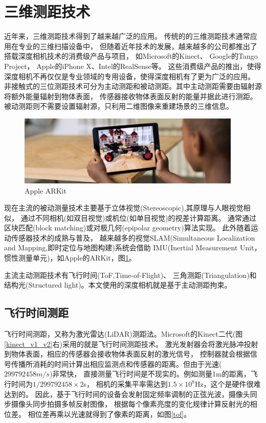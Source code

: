 \section{三维测距技术}
近年来，三维测距技术得到了越来越广泛的应用。
传统的的三维测距技术通常应用在专业的三维扫描设备中，
但随着近年技术的发展，越来越多的公司都推出了搭载深度相机技术的消费级产品与项目，
如Microsoft的Kinect\cite{microsoft_kinect}、
Google的Tango\cite{google_tango} Project，
Apple的iPhone X\cite{apple_iphoneX}、Intel的RealSense\cite{intel_realsense}等。
这些消费级产品的推出，使得深度相机不再仅仅是专业领域的专用设备，使得深度相机有了更为广泛的应用。
非接触式的三位测距技术可分为主动测距和被动测距。其中主动测距需要由辐射源将额外能量辐射到物体表面，
传感器接收物体表面反射的能量并据此进行测距。被动测距则不需要设置辐射源，只利用二维图像来重建场景的三维信息。

\begin{figure}[h]
    \centering
    \includegraphics[width=0.95\textwidth]{./Pictures/ARKit.eps}
    \caption{Apple ARKit}
    \label{arkit}
\end{figure}
现在主流的被动测量技术主要基于立体视觉(Stereoscopic),其原理与人眼视觉相似，
通过不同相机(如双目视觉)或机位(如单目视觉)的视差计算距离。
通常通过区块匹配(block matching)或对极几何(epipolar geometry)算法实现。
此外随着运动传感器技术的成熟与普及，
越来越多的视觉SLAM(Simultaneous Localization and Mapping,即时定位与地图构建)系统会借助
IMU(Inertial Measurement Unit，惯性测量单元)，如Apple的ARKit\cite{apple_arkit}，图\ref{arkit}。

主流主动测距技术有飞行时间(ToF,Time-of-Flight)、
三角测距(Triangulation)和结构光(Structured light)。本文使用的深度相机就是基于主动测距拘束。
\subsection{飞行时间测距}
飞行时间测距，又称为激光雷达(LiDAR)测距法。Microsoft的Kinect二代(图\ref{kinect_v1_v2}右)采用的就是飞行时间测距技术。
激光发射器会将激光脉冲投射到物体表面，相应的传感器会接收物体表面反射的激光信号，
控制器就会根据信号传播所消耗的时间计算出相应监测点和传感器的距离。但由于光速(\(299792458 m/s\))非常快，
直接测量飞行时间是不现实的。例如测量1m的距离，飞行时间为\(1/299792458 \times 2\)s，
相机的采集平率需达到\(1.5 \times 10^8\)Hz，这个是硬件很难达到的。
因此，基于飞行时间的设备会发射固定频率调制的正弦光波，摄像头同步摄像头同步拍摄多帧反射图像，
根据每个像素亮度的变化规律计算反射光的相位差。
相位差再乘以光速就得到了像素的距离，如图\ref{tof}。

